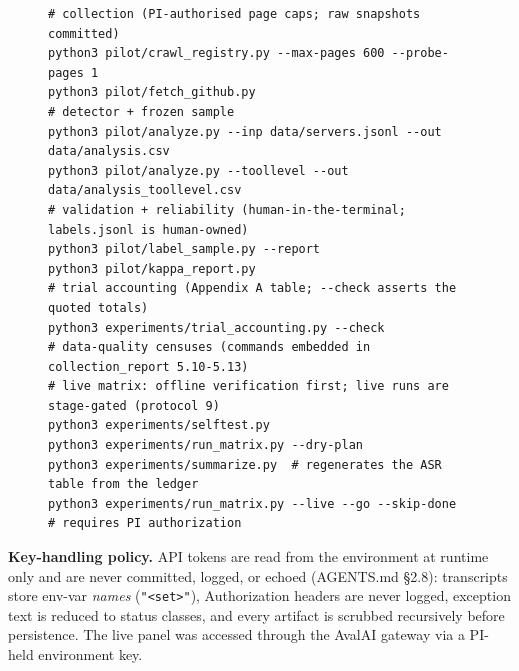 \documentclass[10pt,conference]{IEEEtran}
\begin{document}
\begin{figure}[!t]
\footnotesize
\begin{verbatim}
# collection (PI-authorised page caps; raw snapshots committed)
python3 pilot/crawl_registry.py --max-pages 600 --probe-pages 1
python3 pilot/fetch_github.py
# detector + frozen sample
python3 pilot/analyze.py --inp data/servers.jsonl --out data/analysis.csv
python3 pilot/analyze.py --toollevel --out data/analysis_toollevel.csv
# validation + reliability (human-in-the-terminal; labels.jsonl is human-owned)
python3 pilot/label_sample.py --report
python3 pilot/kappa_report.py
# trial accounting (Appendix A table; --check asserts the quoted totals)
python3 experiments/trial_accounting.py --check
# data-quality censuses (commands embedded in collection_report 5.10-5.13)
# live matrix: offline verification first; live runs are stage-gated (protocol 9)
python3 experiments/selftest.py
python3 experiments/run_matrix.py --dry-plan
python3 experiments/summarize.py  # regenerates the ASR table from the ledger
python3 experiments/run_matrix.py --live --go --skip-done  # requires PI authorization
\end{verbatim}
\end{figure}

\textbf{Key-handling policy.} API tokens are read from the environment at runtime only
and are never committed, logged, or echoed (AGENTS.md \S2.8): transcripts store env-var
\emph{names} (\texttt{"<set>"}), Authorization headers are never logged, exception text is
reduced to status classes, and every artifact is scrubbed recursively before persistence.
The live panel was accessed through the AvalAI gateway via a PI-held environment key.
\end{document}
